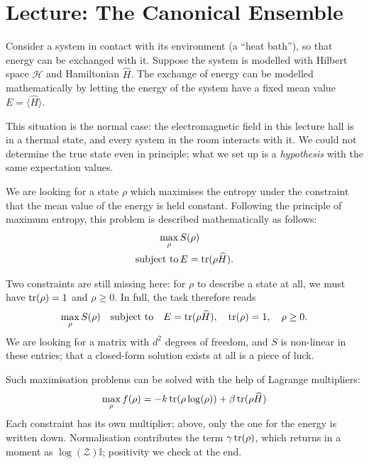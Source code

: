 

\section{Lecture: The Canonical Ensemble}
Consider a system in contact with its environment (a ``heat bath''), so that energy can be exchanged with it. Suppose the system is modelled with Hilbert space $\mathcal{H}$ and Hamiltonian $\widehat{H}$. The exchange of energy can be modelled mathematically by letting the energy of the system have a fixed mean value $E = \langle \widehat{H}\rangle$.

This situation is the normal case: the electromagnetic field in this lecture hall is in a thermal state, and every system in the room interacts with it. We could not determine the true state even in principle; what we set up is a \emph{hypothesis} with the same expectation values.

We are looking for a state $\rho$ which maximises the entropy under the constraint that the mean value of the energy is held constant. Following the principle of maximum entropy, this problem is described mathematically as follows:
\begin{equation}
	\begin{split}
		\max_{\rho} &\,S(\rho) \\
		\text{subject to} &\, E=\operatorname{tr}(\rho \widehat{H}).
	\end{split}
\end{equation}

Two constraints are still missing here: for $\rho$ to describe a state at all, we must have $\operatorname{tr}(\rho)=1$ and $\rho \ge 0$. In full, the task therefore reads
\begin{equation}
	\max_{\rho} S(\rho) \quad\text{subject to}\quad E=\operatorname{tr}(\rho \widehat{H}),\quad \operatorname{tr}(\rho)=1,\quad \rho\ge 0.
\end{equation}
We are looking for a matrix with $d^2$ degrees of freedom, and $S$ is non-linear in these entries; that a closed-form solution exists at all is a piece of luck.

Such maximisation problems can be solved with the help of Lagrange multipliers: 
\begin{equation}
	\max_{\rho} f(\rho) = -k\operatorname{tr}(\rho\log(\rho)) + \beta \operatorname{tr}(\rho \widehat{H})
\end{equation}
Each constraint has its own multiplier; above, only the one for the energy is written down. Normalisation contributes the term $\gamma\operatorname{tr}(\rho)$, which returns in a moment as $\log(\mathcal{Z})\mathbb{I}$; positivity we check at the end.

